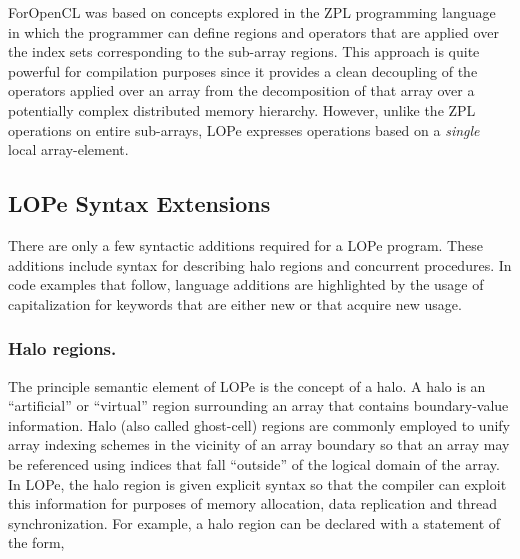 ForOpenCL was based on concepts explored in the ZPL programming language~\cite{chamberlain04zpl} in
which the programmer can define regions and operators that are applied over the index sets
corresponding to the sub-array regions.  This approach is quite powerful for
compilation purposes since it provides a clean decoupling of the operators applied over an array
from the decomposition of that array over a potentially complex distributed memory hierarchy.
However, unlike the ZPL operations on entire sub-arrays, LOPe expresses operations based on
a \emph{single} local array-element.

%
%


\subsection{LOPe Syntax Extensions}

There are only a few syntactic additions required for a LOPe program.
These additions include syntax for describing halo regions and
concurrent procedures.  In code examples that follow,
language additions are highlighted by the usage of capitalization for
keywords that are either new or that acquire new usage.

\subsubsection{Halo regions.}
The principle semantic element of LOPe is the concept of a halo.
A halo is an ``artificial'' or ``virtual'' region surrounding
an array that contains boundary-value information.  Halo (also called
ghost-cell) regions are commonly employed to unify array indexing
schemes in the vicinity of an array boundary so that an array may be
referenced using indices that fall ``outside'' of the logical domain
of the array.  In LOPe, the halo region is given explicit syntax so
that the compiler can exploit this information for purposes of memory
allocation, data replication and thread synchronization.  For example,
a halo region can be declared with a statement of the form,

